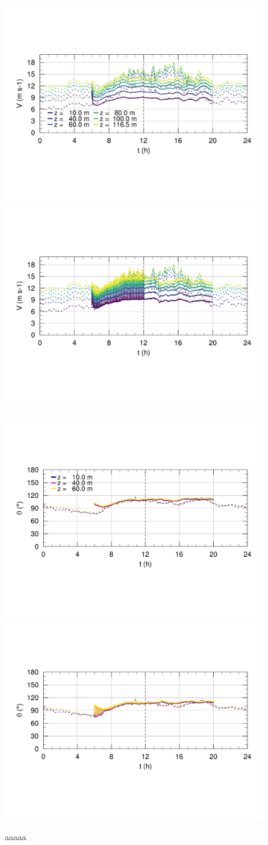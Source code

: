 \begin{figure}[H]
	\centering
	\includegraphics[width=0.5\linewidth,trim={7mm 75mm 10mm 50mm},clip]{Imagenes/06/hov/ts_v}%
	\includegraphics[width=0.5\linewidth,trim={35mm 75mm -18mm 50mm},clip]{Imagenes/06/hov_da/ts_v}%
	
	\includegraphics[width=0.5\linewidth,trim={12mm 53mm 10mm 50mm},clip]{Imagenes/06/hov/ts_o}%
	\includegraphics[width=0.5\linewidth,trim={38mm 53mm -16mm 50mm},clip]{Imagenes/06/hov_da/ts_o}%
	\caption{aaaaa}
	\label{fig:06_hov_ts}
\end{figure}

